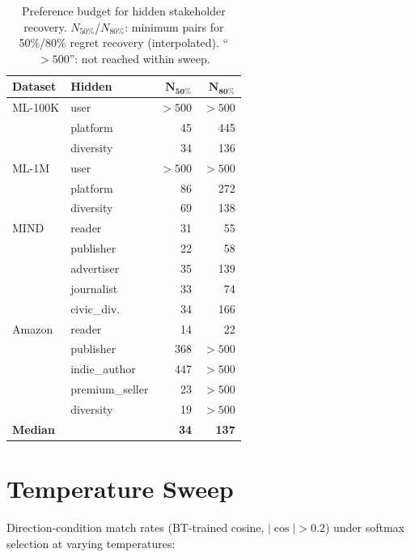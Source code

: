 \documentclass[11pt,letterpaper]{article}
\begin{document}
\begin{table}[h]
  \centering\small
  \caption{Preference budget for hidden stakeholder recovery.
    $N_{50\%}$/$N_{80\%}$: minimum pairs for 50\%/80\% regret
    recovery (interpolated). ``$>500$'': not reached within sweep.}
  \label{tab:budget_full}
  \begin{tabular}{llrr}
    \toprule
    \textbf{Dataset} & \textbf{Hidden} &
      $\boldsymbol{N_{50\%}}$ & $\boldsymbol{N_{80\%}}$ \\
    \midrule
    ML-100K & user      & $>500$ & $>500$ \\
            & platform  & 45     & 445 \\
            & diversity & 34     & 136 \\
    \midrule
    ML-1M   & user      & $>500$ & $>500$ \\
            & platform  & 86     & 272 \\
            & diversity & 69     & 138 \\
    \midrule
    MIND    & reader          & 31  & 55 \\
            & publisher       & 22  & 58 \\
            & advertiser      & 35  & 139 \\
            & journalist      & 33  & 74 \\
            & civic\_div.     & 34  & 166 \\
    \midrule
    Amazon  & reader          & 14  & 22 \\
            & publisher       & 368 & $>500$ \\
            & indie\_author   & 447 & $>500$ \\
            & premium\_seller & 23  & $>500$ \\
            & diversity       & 19  & $>500$ \\
    \midrule
    \multicolumn{2}{l}{\textbf{Median}} & \textbf{34} & \textbf{137} \\
    \bottomrule
  \end{tabular}
\end{table}

\section{Temperature Sweep}
\label{app:temp_sweep}

Direction-condition match rates (BT-trained cosine, $|\cos| > 0.2$)
under softmax selection at varying temperatures:
\end{document}
